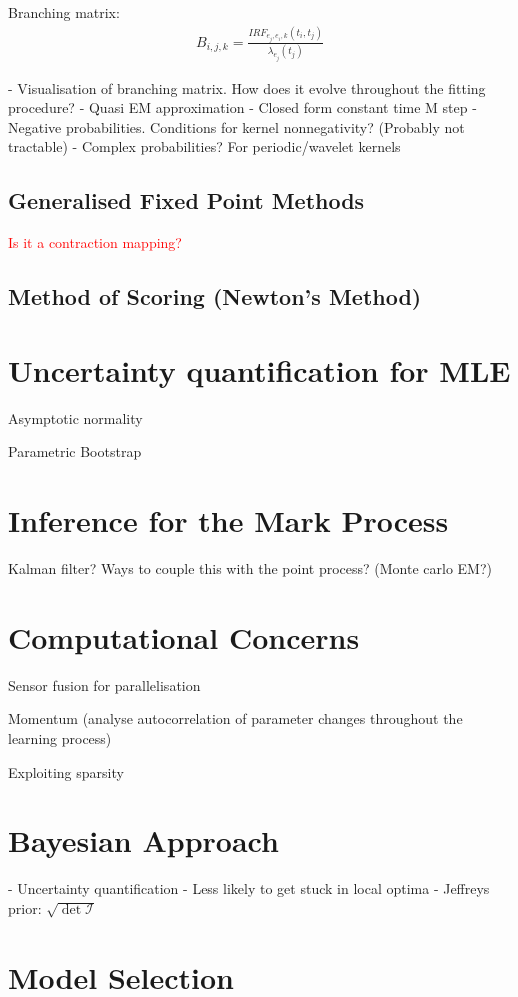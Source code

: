 \documentclass[honours,12pt]{unswthesis}
\numberwithin{equation}{section}
\begin{document}
Branching matrix:
\begin{align*}
	B_{i,j,k} = \frac{IRF_{e_j,e_i,k}(t_i,t_j)}{\lambda_{e_j}(t_j)}
\end{align*}

- Visualisation of branching matrix. How does it evolve throughout the fitting procedure?
- Quasi EM approximation
- Closed form constant time M step
- Negative probabilities. Conditions for kernel nonnegativity? (Probably not tractable)
- Complex probabilities? For periodic/wavelet kernels

\subsection{Generalised Fixed Point Methods}
\textcolor{red}{Is it a contraction mapping?}

\subsection{Method of Scoring (Newton's Method)}

\section{Uncertainty quantification for MLE}
Asymptotic normality

Parametric Bootstrap

\section{Inference for the Mark Process}
Kalman filter? Ways to couple this with the point process? (Monte carlo EM?)

\section{Computational Concerns}
Sensor fusion for parallelisation

Momentum (analyse autocorrelation of parameter changes throughout the learning process)

Exploiting sparsity \cite{NickelLe}

\section{Bayesian Approach}
- Uncertainty quantification
- Less likely to get stuck in local optima
- Jeffreys prior: $\sqrt{\det \mathcal{I}}$

\section{Model Selection}
\end{document}
